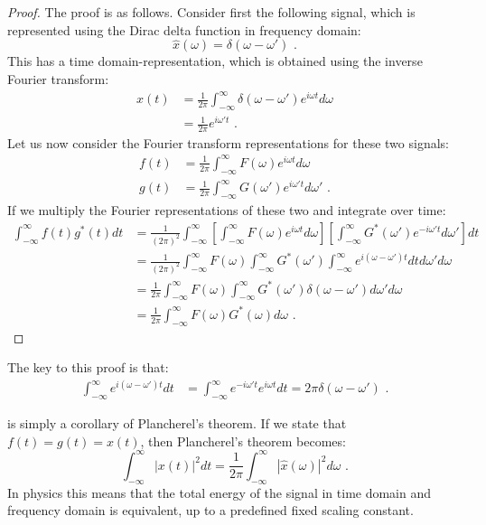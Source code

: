 \begin{proof}
The proof is as follows. Consider first the following signal, which is represented using the Dirac delta function in frequency domain:
\begin{equation}
\hat{x}(\omega) = \delta(\omega-\omega')\,\,.
\end{equation}
This has a time domain-representation, which is obtained using the inverse Fourier transform:
\begin{align}
x(t) &= \frac{1}{2\pi} \int_{-\infty}^{\infty} \delta(\omega-\omega')e^{i\omega t}d\omega \\
     &= \frac{1}{2\pi} e^{i\omega' t}\,\,.
\end{align}
Let us now consider the Fourier transform representations for these two signals:
\begin{align}
f(t) &= \frac{1}{2\pi} \int_{-\infty}^{\infty} F(\omega) e^{i\omega t}d\omega \\
g(t) &= \frac{1}{2\pi} \int_{-\infty}^{\infty} G(\omega') e^{i\omega' t}d\omega'\,\,.
\end{align}
If we multiply the Fourier representations of these two and integrate
over time:
\begin{align}
\int_{-\infty}^{\infty} f(t)g^*(t)dt &= \frac{1}{(2\pi)^2} \int_{-\infty}^{\infty}  \left[\int_{-\infty}^{\infty} F(\omega) e^{i\omega t}d\omega \right] \left[ \int_{-\infty}^{\infty} G^*(\omega') e^{-i\omega' t}d\omega' \right]dt\\
&= \frac{1}{(2\pi)^2} \int_{-\infty}^{\infty} F(\omega) \int_{-\infty}^{\infty} G^*(\omega') \int_{-\infty}^{\infty} e^{i(\omega-\omega')t}dt d\omega' d\omega\\
&=\frac{1}{2\pi} \int_{-\infty}^{\infty} F(\omega) \int_{-\infty}^{\infty} G^*(\omega') \delta(\omega-\omega') d\omega' d\omega \\
&=\frac{1}{2\pi} \int_{-\infty}^{\infty} F(\omega) G^*(\omega)  d\omega \,\,.
\end{align}
\end{proof}
The key to this proof is that:
\begin{align}
\int_{-\infty}^{\infty} e^{i(\omega-\omega')t}dt &= \int_{-\infty}^{\infty} e^{-i\omega' t} e^{i\omega t} dt = 2\pi \delta(\omega - \omega')\,\,.
\end{align}


 is simply a corollary of Plancherel's theorem. If we state that $f(t)=g(t)=x(t)$, then Plancherel's theorem becomes:
\begin{equation}
\boxed{
\int_{-\infty}^{\infty} |x(t)|^2 dt = \frac{1}{2\pi} \int_{-\infty}^{\infty} | \hat{x}(\omega)|^2 d\omega\,\,.
}
\end{equation}
In physics this means that the total energy of the signal in time domain and frequency domain is equivalent, up to a predefined fixed scaling constant. 


